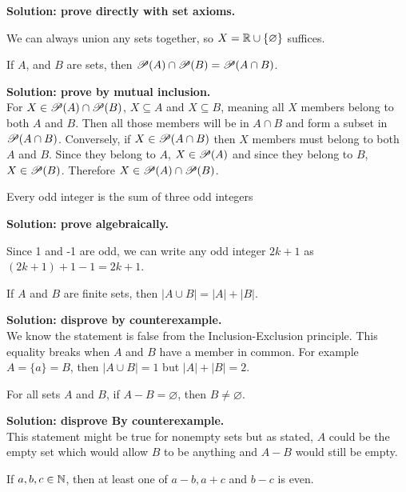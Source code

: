 \documentclass{article}
\begin{document}
\textbf{Solution: prove directly with set axioms.}

We can always union any sets together, so $X = \mathbb{R} \cup \{\varnothing\}$ suffices.

\begin{problem}
If $A$, and $B$ are sets, then $\mathscr{P}(A) \cap \mathscr{P}(B) = \mathscr{P}(A \cap B)$.
\end{problem}

\textbf{Solution: prove by mutual inclusion.}
\\
For $X \in \mathscr{P}(A) \cap \mathscr{P}(B)$, $X \subseteq A$ and $X \subseteq B$, meaning all $X$ members belong to both $A$ and $B$. Then all those members will be in $A \cap B$ and form a subset in $\mathscr{P}(A \cap B)$. Conversely, if $X \in \mathscr{P}(A \cap B)$ then $X$ members must belong to both $A$ and $B$. Since they belong to $A$, $X \in \mathscr{P}(A)$ and since they belong to $B$, $X \in \mathscr{P}(B)$. Therefore $X \in \mathscr{P}(A) \cap \mathscr{P}(B)$.

\begin{problem}
Every odd integer is the sum of three odd integers
\end{problem}

\textbf{Solution: prove algebraically.}

Since 1 and -1 are odd, we can write any odd integer $2k + 1$ as $(2k + 1) + 1 - 1 = 2k + 1$.

\begin{problem}
If $A$ and $B$ are finite sets, then $|A \cup B| = |A| + |B|$.
\end{problem}
\textbf{Solution: disprove by counterexample.}
\\

We know the statement is false from the Inclusion-Exclusion principle. This equality breaks when $A$ and $B$ have a member in common. For example $A = \{a\} = B$, then $|A \cup B| = 1$ but $|A| + |B| = 2$.

\begin{problem}
For all sets $A$ and $B$, if $A - B = \varnothing$, then $B \neq \varnothing$.
\end{problem}

\textbf{Solution: disprove By counterexample.}
\\

This statement might be true for nonempty sets but as stated, $A$ could be the empty set which would allow $B$ to be anything and $A - B$ would still be empty.

\begin{problem}
If $a, b, c \in \mathbb{N}$, then at least one of $a - b, a + c$ and $b - c$ is even.
\end{problem}
\end{document}
